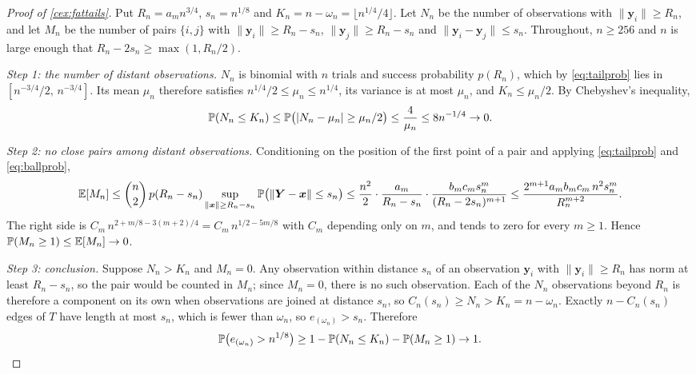 \begin{proof}[Proof of \cref{cex:fattails}]
  Put $R_n=a_mn^{3/4}$, $s_n=n^{1/8}$ and $K_n=n-\omega_n=\lfloor n^{1/4}/4\rfloor$. Let $N_n$ be the number of observations with $\|\bm{y}_i\|\ge R_n$, and let $M_n$ be the number of pairs $\{i,j\}$ with $\|\bm{y}_i\|\ge R_n-s_n$, $\|\bm{y}_j\|\ge R_n-s_n$ and $\|\bm{y}_i-\bm{y}_j\|\le s_n$. Throughout, $n\ge256$ and $n$ is large enough that $R_n-2s_n\ge\max(1,R_n/2)$.

  \emph{Step 1: the number of distant observations.} $N_n$ is binomial with $n$ trials and success probability $p(R_n)$, which by \eqref{eq:tailprob} lies in $[n^{-3/4}/2,\,n^{-3/4}]$. Its mean $\mu_n$ therefore satisfies $n^{1/4}/2\le\mu_n\le n^{1/4}$, its variance is at most $\mu_n$, and $K_n\le\mu_n/2$. By Chebyshev's inequality,
  $$
  \P(N_n\le K_n)\le\P\big(|N_n-\mu_n|\ge\mu_n/2\big)\le\frac{4}{\mu_n}\le8n^{-1/4}\to0.
  $$

  \emph{Step 2: no close pairs among distant observations.} Conditioning on the position of the first point of a pair and applying \eqref{eq:tailprob} and \eqref{eq:ballprob},
  $$
  \E[M_n]\le\binom{n}{2}\,p(R_n-s_n)\sup_{\|\bm{x}\|\ge R_n-s_n}\P\big(\|\bm{Y}-\bm{x}\|\le s_n\big)
  \le\frac{n^2}{2}\cdot\frac{a_m}{R_n-s_n}\cdot\frac{b_mc_ms_n^m}{(R_n-2s_n)^{m+1}}
  \le\frac{2^{m+1}a_mb_mc_m\,n^2s_n^m}{R_n^{m+2}}.
  $$
  The right side is $C_m\,n^{2+m/8-3(m+2)/4}=C_m\,n^{1/2-5m/8}$ with $C_m$ depending only on $m$, and tends to zero for every $m\ge1$. Hence $\P(M_n\ge1)\le\E[M_n]\to0$.

  \emph{Step 3: conclusion.} Suppose $N_n>K_n$ and $M_n=0$. Any observation within distance $s_n$ of an observation $\bm{y}_i$ with $\|\bm{y}_i\|\ge R_n$ has norm at least $R_n-s_n$, so the pair would be counted in $M_n$; since $M_n=0$, there is no such observation. Each of the $N_n$ observations beyond $R_n$ is therefore a component on its own when observations are joined at distance $s_n$, so $C_n(s_n)\ge N_n>K_n=n-\omega_n$. Exactly $n-C_n(s_n)$ edges of $T$ have length at most $s_n$, which is fewer than $\omega_n$, so $e_{(\omega_n)}>s_n$. Therefore
  \begin{equation*}
  \P\big(e_{(\omega_n)}>n^{1/8}\big)\ge1-\P(N_n\le K_n)-\P(M_n\ge1)\to1.\qedhere
  \end{equation*}
\end{proof}

